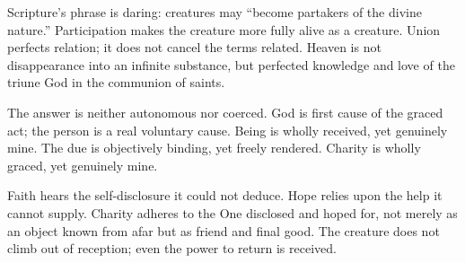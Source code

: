 Scripture's phrase is daring: creatures may ``become partakers of the divine nature.'' Participation makes the creature more fully alive as a creature. Union perfects relation; it does not cancel the terms related. Heaven is not disappearance into an infinite substance, but perfected knowledge and love of the triune God in the communion of saints.

The answer is neither autonomous nor coerced. God is first cause of the graced act; the person is a real voluntary cause. Being is wholly received, yet genuinely mine. The due is objectively binding, yet freely rendered. Charity is wholly graced, yet genuinely mine.

Faith hears the self-disclosure it could not deduce. Hope relies upon the help it cannot supply. Charity adheres to the One disclosed and hoped for, not merely as an object known from afar but as friend and final good. The creature does not climb out of reception; even the power to return is received.
